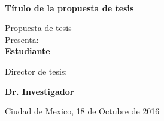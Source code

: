 \documentclass[letter]{letter}
\begin{document}
	\begin{minipage}[c][0.8\textheight][c]{0.2\textwidth}
		\begin{center}
			\hskip2pt
			\vrule width2.5pt height17cm 
			\hskip1mm
			\vrule width1pt height17cm \\     	
			\end{center}
	\end{minipage}
	\begin{minipage}[c][0.6\textheight][c]{0.65\textwidth}
	\begin{center}
	
	{\Large \textbf{T\'itulo de la propuesta de tesis}}
	\vspace{1cm}
	
	{\large {Propuesta de tesis}}\\[40pt]            
	Presenta:\\[5pt]
	\textbf{{Estudiante}}
	
	\vspace{1cm}
	
	{\small Director de tesis:}
	
	{\large \textbf{Dr. Investigador}}
	
	\vspace{2cm}
	
	{Ciudad de Mexico,}{ }{18 de Octubre de 2016}
	\end{center}
	\end{minipage}
\end{document}

